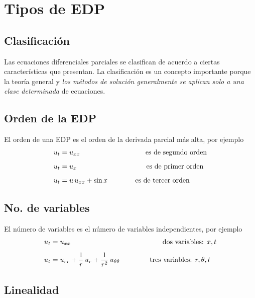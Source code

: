 \section{Tipos de EDP}
\subsection{Clasificación}

Las ecuaciones diferenciales parciales se clasifican de acuerdo a ciertas características que presentan. La clasificación es un concepto importante porque la teoría general y \emph{los métodos de solución generalmente se aplican solo a una clase determinada} de ecuaciones.

\subsection*{Orden de la EDP}

El orden de una EDP es el orden de la derivada parcial más alta, por ejemplo
\begin{align*}
u_{t} &= u_{xx} \hspace{3.3cm} \mbox{es de segundo orden} \\[0.5em] 
u_{t} &= u_{x} \hspace{3.5cm} \mbox{es de primer orden} \\[0.5em] 
u_{t} &= u \, u_{xx} + \sin x \hspace{1.4cm} \mbox{es de tercer orden}
\end{align*}

\subsection*{No. de variables}

El número de variables es el número de variables independientes, por ejemplo
\begin{align*}
u_{t} &= u_{xx} \hspace{3cm} \hspace{1.61cm} \mbox{dos variables: } x, t \\[0.5em] 
u_{t} &= u_{rr} + \dfrac{1}{r} \, u_{r} + \dfrac{1}{r^{2}} \, u_{\theta \theta} \hspace{1.5cm} \mbox{tres variables: } r, \theta, t
\end{align*}

\subsection*{Linealidad}

